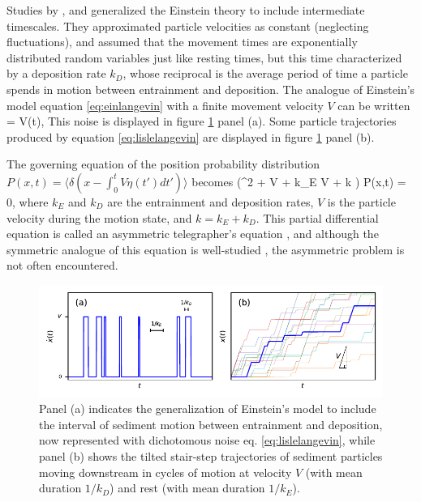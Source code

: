 Studies by \citet{Lisle1998}, and \citet{Lajeunesse2017} generalized the Einstein theory to include intermediate timescales. They approximated particle velocities as constant (neglecting fluctuations), and assumed that the movement times are exponentially distributed random variables just like resting times, but this time characterized by a deposition rate $k_D$, whose reciprocal is the average period of time a particle spends in motion between entrainment and deposition.
The analogue of Einstein's model equation \ref{eq:einlangevin} with a finite movement velocity $V$ can be written
\be {} = V\eta(t), \label{eq:lislelangevin}\ee
This noise is displayed in figure \ref{fig:lislefig} panel (a). Some particle trajectories produced by equation \ref{eq:lislelangevin} are displayed in figure \ref{fig:lislefig} panel (b).

The governing equation of the position probability distribution $P(x,t) = \langle \delta(x-\int_0^t V\eta(t')dt') \rangle$ becomes \citep{Balakrishnan1993}
\be \big(\pt^2 + V \px \pt + k_E V \px + k \pt \big) P(x,t) = 0,\label{eq:lislemaster}\ee
where $k_E$ and $k_D$ are the entrainment and deposition rates, $V$ is the particle velocity during the motion state, and $k = k_E+k_D$. This partial differential equation is called an asymmetric telegrapher's equation \citep{Rossetto2018}, and although the symmetric analogue of this equation is well-studied \citep{Weiss2002a, Masoliver2017}, the asymmetric problem is not often encountered.
\begin{figure}[!htbp]
	\includegraphics[width=\linewidth,keepaspectratio]{./figures/ch1/lisleConcept.pdf}
	\caption{Panel (a) indicates the generalization of Einstein's model to include the interval of sediment motion between entrainment and deposition, now represented with dichotomous noise eq. \ref{eq:lislelangevin}, while panel (b) shows the tilted stair-step trajectories of sediment particles moving downstream in cycles of motion at velocity $V$ (with mean duration $1/k_D$) and rest (with mean duration $1/k_E$). }
	\label{fig:lislefig}
\end{figure}

